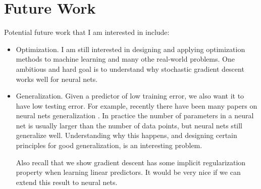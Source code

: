 \documentclass{article}
\theoremstyle{definition}
\theoremstyle{remark}
\begin{document}
\section{Future Work}
Potential future work that I am interested in include:
\begin{itemize}
    \item Optimization. I am still interested in designing and applying optimization methods to machine learning and many othe real-world problems. One ambitious and hard goal is to understand why stochastic gradient descent works well for neural nets.

    \item Generalization. Given a predictor of low training error, we also want it to have low testing error. For example, recently there have been many papers on neural nets generalization \citep{BFT17, GRS17, AGNZ18}. In practice the number of parameters in a neural net is usually larger than the number of data points\citep{ZBHRV17}, but neural nets still generalize well. Understanding why this happens, and designing certain principles for good generalization, is an interesting problem.

    Also recall that we show gradient descent has some implicit regularization property when learning linear predictors. It would be very nice if we can extend this result to neural nets.
\end{itemize}



\end{document}
